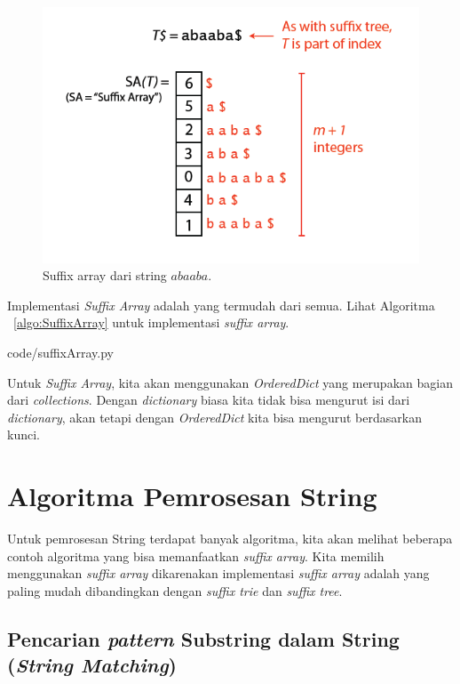 	\begin{figure}
		\includegraphics[width=\textwidth,keepaspectratio]{fig/suffixarray.png}%
		\caption{Suffix array dari string $abaaba$.}%
		\label{fig:suffixarray}%
	\end{figure}
	
Implementasi \textit{Suffix Array} adalah yang termudah dari semua. Lihat Algoritma ~\ref{algo:SuffixArray} untuk implementasi \textit{suffix array}.


                {code/suffixArray.py}

Untuk \textit{Suffix Array}, kita akan menggunakan \textit{OrderedDict} yang merupakan bagian dari \textit{collections}. Dengan \textit{dictionary} biasa kita tidak bisa mengurut isi dari \textit{dictionary}, akan tetapi dengan \textit{OrderedDict} kita bisa mengurut berdasarkan kunci. 

\section{Algoritma Pemrosesan String}

Untuk pemrosesan String terdapat banyak algoritma, kita akan melihat beberapa contoh algoritma yang bisa memanfaatkan \textit{suffix array}. Kita memilih menggunakan \textit{suffix array} dikarenakan implementasi \textit{suffix array} adalah yang paling mudah dibandingkan dengan \textit{suffix trie} dan \textit{suffix tree}.

\subsection{Pencarian \textit{pattern} Substring dalam String (\textit{String Matching})}

